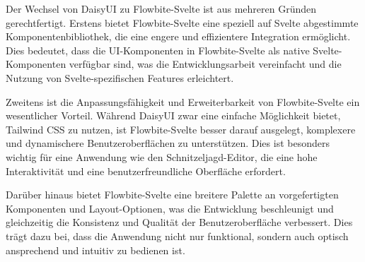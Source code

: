Der Wechsel von DaisyUI zu Flowbite-Svelte ist aus mehreren Gründen gerechtfertigt. Erstens bietet Flowbite-Svelte eine speziell auf Svelte abgestimmte Komponentenbibliothek, die eine engere und effizientere Integration ermöglicht. Dies bedeutet, dass die UI-Komponenten in Flowbite-Svelte als native Svelte-Komponenten verfügbar sind, was die Entwicklungsarbeit vereinfacht und die Nutzung von Svelte-spezifischen Features erleichtert.

Zweitens ist die Anpassungsfähigkeit und Erweiterbarkeit von Flowbite-Svelte ein wesentlicher Vorteil. Während DaisyUI zwar eine einfache Möglichkeit bietet, Tailwind CSS zu nutzen, ist Flowbite-Svelte besser darauf ausgelegt, komplexere und dynamischere Benutzeroberflächen zu unterstützen. Dies ist besonders wichtig für eine Anwendung wie den Schnitzeljagd-Editor, die eine hohe Interaktivität und eine benutzerfreundliche Oberfläche erfordert.

Darüber hinaus bietet Flowbite-Svelte eine breitere Palette an vorgefertigten Komponenten und Layout-Optionen, was die Entwicklung beschleunigt und gleichzeitig die Konsistenz und Qualität der Benutzeroberfläche verbessert. Dies trägt dazu bei, dass die Anwendung nicht nur funktional, sondern auch optisch ansprechend und intuitiv zu bedienen ist.